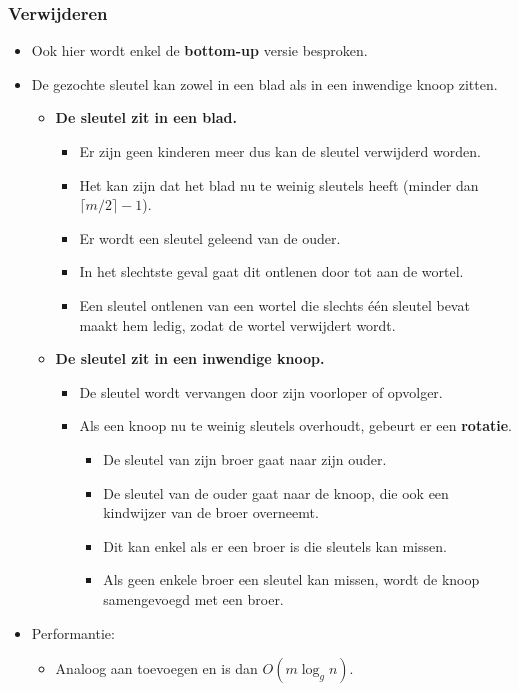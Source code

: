 \subsubsection{Verwijderen}
\begin{itemize}
    \item Ook hier wordt enkel de \textbf{bottom-up} versie besproken.
    \item De gezochte sleutel kan zowel in een blad als in een inwendige knoop zitten.
    \begin{itemize}
        \item \textbf{De sleutel zit in een blad.}
        \begin{itemize}
            \item Er zijn geen kinderen meer dus kan de sleutel verwijderd worden.
            \item Het kan zijn dat het blad nu te weinig sleutels heeft (minder dan $\lceil m/2 \rceil - 1$).
            \item Er wordt een sleutel geleend van de ouder.
            \item In het slechtste geval gaat dit ontlenen door tot aan de wortel.
            \item Een sleutel ontlenen van een wortel die slechts één sleutel bevat maakt hem ledig, zodat de wortel verwijdert wordt.
        \end{itemize}
        \item \textbf{De sleutel zit in een inwendige knoop.}
        \begin{itemize}
            \item De sleutel wordt vervangen door zijn voorloper of opvolger.
            \item Als een knoop nu te weinig sleutels overhoudt, gebeurt er een \textbf{rotatie}.
            \begin{itemize}
                \item De sleutel van zijn broer gaat naar zijn ouder.
                \item De sleutel van de ouder gaat naar de knoop, die ook een kindwijzer van de broer overneemt.
                \item Dit kan enkel als er een broer is die sleutels kan missen.
                \item Als geen enkele broer een sleutel kan missen, wordt de knoop samengevoegd met een broer.
            \end{itemize}
        \end{itemize}
    \end{itemize}
    \item Performantie:
    \begin{itemize}
        \item Analoog aan toevoegen en is dan $O(m\log_g n)$.
    \end{itemize}
\end{itemize}
